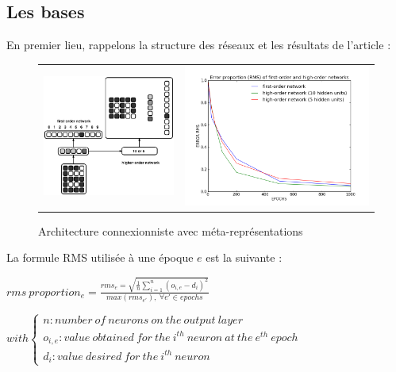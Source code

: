 \documentclass[a4paper,12pt, twoside]{article}
\begin{document}
\subsection{Les bases}
En premier lieu, rappelons la structure des réseaux et les résultats de l'article :
\begin{figure}[H]
\begin{center}
\begin{tabular}{cc}
 \includegraphics[width=190px]{../cleeremans_2007/digit_reco/digit_reco.png} &
 \includegraphics[width=270px]{../cleeremans_2007/digit_reco/rms.png}
\end{tabular}
\end{center}
\caption{ \cite{Cleeremans_2007} Architecture connexionniste avec méta-représentations  }
\end{figure}

La formule RMS utilisée à une époque $e$ est la suivante :
\begin{center}
\begin{large}
$ rms\ proportion_{e} = \frac{ rms_{e} = \sqrt{ \frac{1}{n} \sum \limits_{i=1}^{n} ( o_{i,e} - d_{i} )^2 }}{max(rms_{e'}),\ \forall e' \in epochs } $
\end{large}
$ with \left\lbrace \begin{array}{lll} n : number\ of\ neurons\ on\ the\ output\ layer\\o_{i,e} : value\ obtained\ for\ the\ i^{th}\ neuron\ at\ the\ e^{th}\ epoch\\d_{i} : value\ desired \ for\ the\ i^{th}\ neuron\end{array} \right.$
\end{center}
\end{document}
